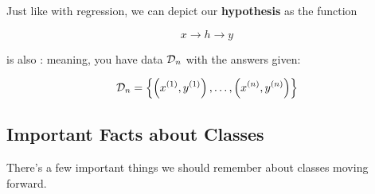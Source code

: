         Just like with regression, we can depict our \textbf{hypothesis} as the function
        
        \begin{equation}
             x \rightarrow \boxed{h} \rightarrow y 
        \end{equation}

        \begin{concept}
             is also : meaning, you have  data ${\cal D}_n$ with the  answers given:
            
            \begin{equation*}
                {\cal D}_n = 
                \left\{
                    \left(  x^{(1)}, y^{(1)}    \right), 
                    \dots, 
                    \left(  x^{(n)}, y^{(n)}    \right)
                \right\}
            \end{equation*}
        \end{concept}
        
        
    \subsection{Important Facts about Classes}
    
        There's a few important things we should remember about classes moving forward.
        
